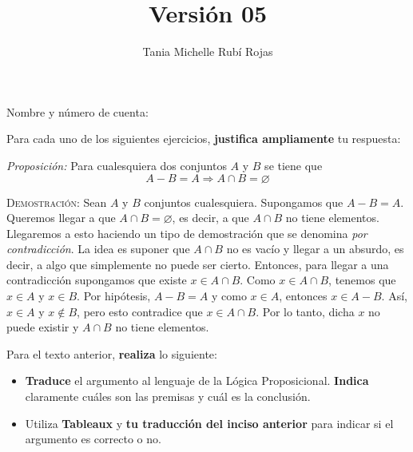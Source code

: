 \documentclass[oneside]{style}
\title{Versión 05}
\author{Tania Michelle Rubí Rojas}
\begin{document}
\maketitle

\vspace{5mm}
\noindent
Nombre y número de cuenta: \hrulefill\

\vspace*{5mm}
Para cada uno de los siguientes ejercicios, \textbf{justifica ampliamente} tu 
respuesta:

\begin{questions}[label=\protect\circled{\bfseries\arabic*}]

    \question
    {
        \textit{Proposición:} Para cualesquiera dos conjuntos $A$ y $B$ se tiene 
        que 
        \begin{equation*}
            A - B = A \Rightarrow A \cap B = \varnothing
        \end{equation*}

        \textsc{Demostración}: Sean $A$ y $B$ conjuntos cualesquiera. Supongamos 
        que $A-B = A$. Queremos llegar a que $A \cap B = \varnothing$, es decir, 
        a que $A \cap B$ no tiene elementos. Llegaremos a esto haciendo un tipo 
        de demostración que se denomina \textit{por contradicción}. La idea es 
        suponer que $A \cap B$ no es vacío y llegar a un absurdo, es decir, a algo 
        que simplemente no puede ser cierto. Entonces, para llegar a una 
        contradicción supongamos que existe $x \in A \cap B$. Como $x \in A \cap B$, 
        tenemos que $x \in A$ y $x \in B$. Por hipótesis, $A - B = A$ y como 
        $x \in A$, entonces $x \in A - B$. Así, $x \in A$ y $x \notin B$, pero esto 
        contradice que $x \in A \cap B$. Por lo tanto, dicha $x$ no puede existir y 
        $A \cap B$ no tiene elementos. 

        \vspace*{5mm}

        Para el texto anterior, \textbf{realiza} lo siguiente:
        \begin{itemize}
            \item \textbf{Traduce} el argumento al lenguaje de la Lógica 
            Proposicional. \textbf{Indica} claramente cuáles son las premisas y
            cuál es la conclusión.
            
            \item Utiliza \textbf{Tableaux} y \textbf{tu traducción del inciso 
            anterior} para indicar si el argumento es correcto o no. 
        \end{itemize}
    }


\end{questions}
\end{document}
